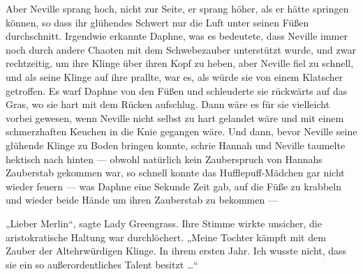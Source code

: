 Aber Neville sprang hoch, nicht zur Seite, er sprang höher, als er hätte springen können, so dass ihr glühendes Schwert nur die Luft unter seinen Füßen durchschnitt. Irgendwie erkannte Daphne, was es bedeutete, dass Neville immer noch durch andere Chaoten mit dem Schwebezauber unterstützt wurde, und zwar rechtzeitig, um ihre Klinge über ihren Kopf zu heben, aber Neville fiel zu schnell, und als seine Klinge auf ihre prallte, war es, als würde sie von einem Klatscher getroffen. Es warf Daphne von den Füßen und schleuderte sie rückwärts auf das Gras, wo sie hart mit dem Rücken aufschlug. Dann wäre es für sie vielleicht vorbei gewesen, wenn Neville nicht selbst zu hart gelandet wäre und mit einem schmerzhaften Keuchen in die Knie gegangen wäre. Und dann, bevor Neville seine glühende Klinge zu Boden bringen konnte, schrie Hannah  und Neville taumelte hektisch nach hinten — obwohl natürlich kein Zauberspruch von Hannahs Zauberstab gekommen war, so schnell konnte das Hufflepuff-Mädchen gar nicht wieder feuern — was Daphne eine Sekunde Zeit gab, auf die Füße zu krabbeln und wieder beide Hände um ihren Zauberstab zu bekommen —

\later

„Lieber Merlin“, sagte Lady Greengrass. Ihre Stimme wirkte unsicher, die aristokratische Haltung war durchlöchert.
„Meine Tochter kämpft mit dem Zauber der Altehrwürdigen Klinge. In ihrem ersten Jahr. Ich wusste nicht, dass sie ein so außerordentliches Talent besitzt …“

